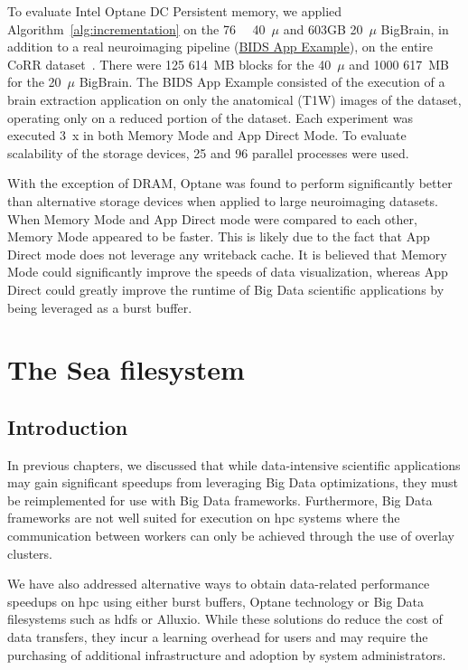 \documentclass{report}
\begin{document}
         To evaluate Intel Optane DC Persistent memory, we applied 
         Algorithm~\ref{alg:incrementation} on the \SI{76}{\giga\byte} 40~$\mu$ and 603GB
        20~$\mu$ BigBrain, in addition to a real neuroimaging pipeline (\href{https://github.com/BIDS-Apps/example}{BIDS App
        Example}), on the entire CoRR
        dataset~\cite{corr}. There were 125 614~MB blocks for the
        40~$\mu$ and 1000 617~MB for the 20~$\mu$ BigBrain.  The BIDS App
        Example consisted of the execution of a brain extraction application on
        only the anatomical (T1W) images of the dataset, operating only on a
        reduced portion of the dataset. Each experiment was
        executed 3~x in both Memory Mode and App Direct Mode. To evaluate
        scalability of the storage devices, 25 and 96 parallel processes were
        used.

        With the exception of DRAM, Optane was found to perform significantly
        better than alternative storage devices when applied to large neuroimaging
        datasets. When Memory Mode and App Direct mode were compared to each other,
        Memory Mode appeared to be faster. This is likely due to the fact that App
        Direct mode does not leverage any writeback cache. It is believed that Memory
        Mode could significantly improve the speeds of data visualization, whereas App
        Direct could greatly improve the runtime of Big Data scientific applications
        by being leveraged as a burst buffer.



    \chapter{The Sea filesystem}
    \section{Introduction}
    In previous chapters, we discussed that while data-intensive scientific 
    applications may gain significant speedups from leveraging Big Data optimizations,
    they must be reimplemented for use with Big Data frameworks. Furthermore, Big Data
    frameworks are not well suited for execution on \gls{hpc} systems where the 
    communication between workers can only be achieved through the use of overlay
    clusters.

    We have also addressed alternative ways to obtain data-related performance speedups on \gls{hpc}
    using either burst buffers, Optane technology or Big Data filesystems such as \gls{hdfs}
    or Alluxio. While these solutions do reduce the cost of data transfers, they incur
    a learning overhead for users and may require the purchasing of additional infrastructure and
    adoption by system administrators.
\end{document}
